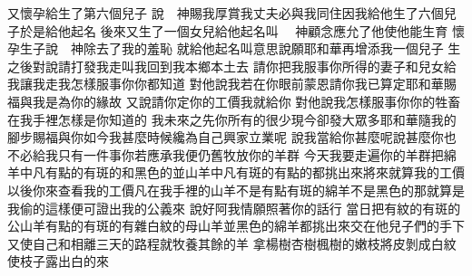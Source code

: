 又懷孕\chientien 給生了第六個兒子\chuan 
{}說\chientien 　神賜我厚賞\chientien 我丈夫必與我同住\chientien 因我給他生了六個兒子\yuentien 於是給他起名\chuan{}
後來又生了一個女兒\chientien 給他起名叫\chuan 
{}　神顧念\chientien 應允了他\chientien 使他能生育\chuan 
{}懷孕生子\chientien 說\chientien 　神除去了我的羞恥\yuentien 
{}就給他起名叫\chientien{}\linebreak{}意思說\chientien 願耶和華再增添我一個兒子\chuan\Chuan
{}生之後\chientien{}對說\chientien 請打發我走\chientien 叫我回到我本鄉本土去\chuan 
{}請你把我服事你所得的妻子\chientien 和兒女給我\chientien 讓我走\yuentien 我怎樣服事你\chientien 你都知道\chuan 
{}對他說\chientien 我若在你眼前蒙恩\chientien 請你\chientien{}我已算定\chientien 耶和華賜福與我\chientien 是為你的緣故\yuentien 
{}又說\chientien 請你定你的工價\chientien 我就給你\chuan 
{}對他說\chientien 我怎樣服事你\chientien 你的牲畜在我手裡怎樣\chientien 是你知道的\chuan 
{}我未來之先\chientien 你所有的很少\chientien 現今卻發大眾多\chientien 耶和華隨我的腳步賜福與你\yuentien 如今\chientien 我甚麼時候纔為自己興家立業呢\chuan 
{}說\chientien 我當給你甚麼呢\chuan{}說\chientien 甚麼你也不必給我\chientien 只有一件事\chientien 你若應承\chientien 我便仍舊牧放你的羊群\chuan 
{}今天我要走遍你的羊群\chientien 把綿羊中凡有點的\chientien 有斑的\chientien 和黑色的\chientien 並山羊中凡有斑的\chientien 有點的\chientien 都挑出來\chientien 將來\chientien 就算我的工價\chuan 
{}以後你來查看我的工價\chientien 凡在我手裡的山羊不是有點有斑的\chientien 綿羊不是黑色的\chientien 那就算是我偷的\yuentien 這樣\chientien 便可證出我的公義來\chuan 
{}說\chientien 好阿\chuan 我情願照著你的話行\chuan 
{}當日把有紋的\chientien 有斑的公山羊\chientien 有點的\chientien 有斑的\chientien 有雜白紋的母山羊\chientien 並黑色的綿羊\chientien 都挑出來\chientien 交在他兒子們的手下\yuentien 
{}又使自己和相離三天的路程\yuentien{}就牧養其餘的羊\chuan\Chuan
{}拿楊樹\chientien 杏樹\chientien 楓樹的嫩枝\chientien 將皮剝成白紋\chientien 使枝子露出白的來\yuentien 
